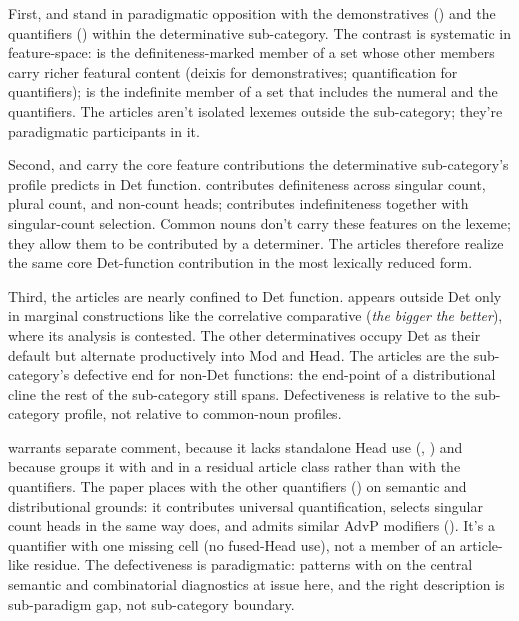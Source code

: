 \documentclass[12pt]{article}
\begin{document}
First,  and  stand in paradigmatic opposition with the demonstratives () and the quantifiers () within the determinative sub-category. The contrast is systematic in feature-space:  is the definiteness-marked member of a set whose other members carry richer featural content (deixis for demonstratives; quantification for quantifiers);  is the indefinite member of a set that includes the numeral  and the quantifiers. The articles aren't isolated lexemes outside the sub-category; they're paradigmatic participants in it.

Second,  and  carry the core feature contributions the determinative sub-category's profile predicts in Det function.  contributes definiteness across singular count, plural count, and non-count heads;  contributes indefiniteness together with singular-count selection. Common nouns don't carry these features on the lexeme; they allow them to be contributed by a determiner. The articles therefore realize the same core Det-function contribution in the most lexically reduced form.

Third, the articles are nearly confined to Det function.  appears outside Det only in marginal constructions like the correlative comparative (\textit{the bigger the better}), where its analysis is contested. The other determinatives occupy Det as their default but alternate productively into Mod and Head. The articles are the sub-category's defective end for non-Det functions: the end-point of a distributional cline the rest of the sub-category still spans. Defectiveness is relative to the sub-category profile, not relative to common-noun profiles.

 warrants separate comment, because it lacks standalone Head use (, ) and because \textcite{spinillo2004reconceptualising} groups it with  and  in a residual article class rather than with the quantifiers. The paper places  with the other quantifiers () on semantic and distributional grounds: it contributes universal quantification, selects singular count heads in the same way  does, and admits similar AdvP modifiers (). It's a quantifier with one missing cell (no fused-Head use), not a member of an article-like residue. The defectiveness is paradigmatic:  patterns with  on the central semantic and combinatorial diagnostics at issue here, and the right description is sub-paradigm gap, not sub-category boundary.
\end{document}
